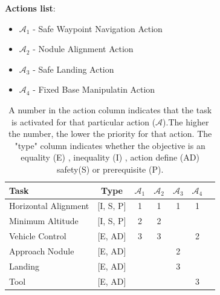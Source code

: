\documentclass{article}
\begin{document}
\noindent
\textbf{Actions list}:
\begin{itemize}
	\item $\mathcal{A}_{1}$ - Safe Waypoint Navigation Action 
	\item $\mathcal{A}_{2}$ - Nodule Alignment Action 
	\item $\mathcal{A}_{3}$ - Safe Landing Action 
	\item $\mathcal{A}_{4}$ - Fixed Base Manipulatin Action
\end{itemize}

\begin{table}[htb]
	\label{tbl:actions_tables}
	\begin{center}
		\footnotesize
		\begin{tabular}{lcccccc}
			\toprule		
			Task & Type & $\mathcal{A}_{1}$ & $\mathcal{A}_{2}$  & $\mathcal{A}_{3}$  & $\mathcal{A}_{4}$ \\
			\midrule
			
			Horizontal Alignment                & [I, S, P] & 1 & 1 & 1 & 1 \\
			\hdashline
			Minimum Altitude                    & [I, S, P] & 2 & 2 & &   \\
			\hdashline 
			Vehicle Control 						& [E, AD] &3 & 3 & & 2\\ 
			\hdashline 
			Approach Nodule  						& [E, AD] & & & 2&  \\ 
			\hdashline
			Landing 						& [E, AD] & &  & 3& \\
			
			\hdashline 
			Tool 					& [E, AD] &  & & &3 \\
			
			\bottomrule
		\end{tabular}
	\end{center}
\caption{A number in the action column indicates that the task is activated for that particular action ($\mathcal{A}$).The higher the number, the lower the priority for that action. The "type" column indicates whether the objective is an equality (E) , inequality (I) , action define (AD) safety(S) or prerequisite (P).}
\end{table}
\end{document}
